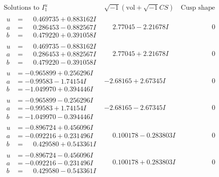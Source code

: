 \documentclass[1p]{elsarticle_modified}
\theoremstyle{definition}
\newcommand{\I}{\sqrt{-1}}
\begin{document}
$$\begin{array}{c|c|c}  
\text{Solutions to }I^u_{1}& \I (\text{vol} + \sqrt{-1}CS) & \text{Cusp shape}\\
 \hline 
\begin{aligned}
u &= \phantom{-}0.469735 + 0.883162 I \\
a &= \phantom{-}0.286453 - 0.882567 I \\
b &= \phantom{-}0.479220 + 0.391058 I\end{aligned}
 & \phantom{-}2.77045 - 2.21678 I & \phantom{-0.000000 } 0 \\ \hline\begin{aligned}
u &= \phantom{-}0.469735 - 0.883162 I \\
a &= \phantom{-}0.286453 + 0.882567 I \\
b &= \phantom{-}0.479220 - 0.391058 I\end{aligned}
 & \phantom{-}2.77045 + 2.21678 I & \phantom{-0.000000 } 0 \\ \hline\begin{aligned}
u &= -0.965899 + 0.256296 I \\
a &= -0.99583 - 1.74154 I \\
b &= -1.049970 + 0.394446 I\end{aligned}
 & -2.68165 + 2.67345 I & \phantom{-0.000000 } 0 \\ \hline\begin{aligned}
u &= -0.965899 - 0.256296 I \\
a &= -0.99583 + 1.74154 I \\
b &= -1.049970 - 0.394446 I\end{aligned}
 & -2.68165 - 2.67345 I & \phantom{-0.000000 } 0 \\ \hline\begin{aligned}
u &= -0.896724 + 0.456096 I \\
a &= -0.092216 + 0.231496 I \\
b &= \phantom{-}0.429580 + 0.543361 I\end{aligned}
 & \phantom{-}0.100178 - 0.283803 I & \phantom{-0.000000 } 0 \\ \hline\begin{aligned}
u &= -0.896724 - 0.456096 I \\
a &= -0.092216 - 0.231496 I \\
b &= \phantom{-}0.429580 - 0.543361 I\end{aligned}
 & \phantom{-}0.100178 + 0.283803 I & \phantom{-0.000000 } 0 \\ \hline\begin{aligned}

\end{aligned}
\end{array}$$
\end{document}
